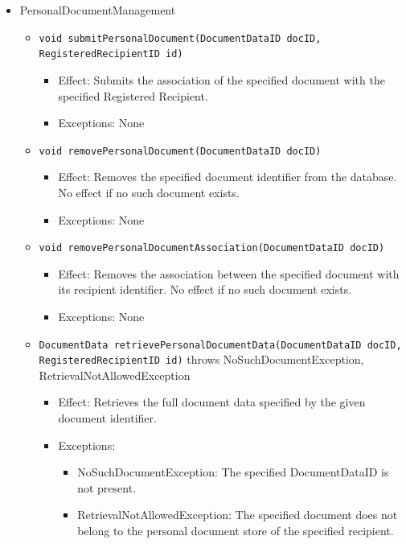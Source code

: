 \documentclass[a4paper,10pt]{article}
\begin{document}
\begin{itemize}
	\item PersonalDocumentManagement
	\begin{itemize}
		\item \texttt{void submitPersonalDocument(DocumentDataID docID, RegisteredRecipientID id)}
		\begin{itemize}
			\item Effect: Submits the association of the specified document with the specified Registered Recipient.
			\item Exceptions: None
		\end{itemize}
		
		\item \texttt{void removePersonalDocument(DocumentDataID docID)}
		\begin{itemize}
			\item Effect: Removes the specified document identifier from the database. No effect if no such document exists.
			\item Exceptions: None
		\end{itemize}
		
		\item \texttt{void removePersonalDocumentAssociation(DocumentDataID docID)}
		\begin{itemize}
			\item Effect: Removes the association between the specified document with its recipient identifier. No effect if no such document exists.
			\item Exceptions: None
		\end{itemize}
		
		\item \texttt{DocumentData retrievePersonalDocumentData(DocumentDataID docID, RegisteredRecipientID id)} throws NoSuchDocumentException, RetrievalNotAllowedException
		\begin{itemize}
			\item Effect: Retrieves the full document data specified by the given document identifier.
			\item Exceptions:
			\begin{itemize}
				\item NoSuchDocumentException: The specified DocumentDataID is not present.
				\item RetrievalNotAllowedException: The specified document does not belong to the personal document store of the specified recipient.
			\end{itemize}
		\end{itemize}
		

\end{itemize}
\end{itemize}
\end{document}

